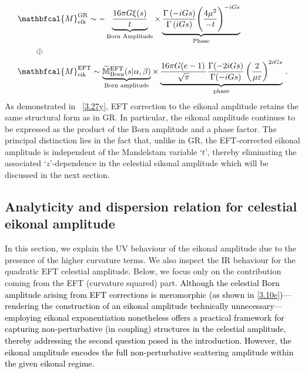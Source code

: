 \begin{tcolorbox}[thesisresultbox, title=Eikonal amplitude: GR vs EFT correction]
\restorethesisbodyformat
\begin{align}
    \begin{split}
&\mathbfcal{M}_{\textrm{eik}}^{\textrm{GR}}\sim -\underbrace{\frac{16  \pi  G \xi (s)}{t}}_{\text{Born Amplitude}}\times\underbrace{\frac{\Gamma\left(-iGs\right)}{\Gamma\left(iGs\right)}\Bigg(\frac{4\mu^2}{-t}\Bigg)^{-iGs}}_{\text{Phase}}\,\,\,\,\,\,\\ 
&
\hspace{0.8cm}\oplus
\\&
\mathbfcal{M}_{\textrm{eik}}^{\textrm{EFT}}\sim\underbrace{\widetilde{\mathbb{M}}^{\textrm{EFT}}_{\textrm{Born}}(s|\alpha,\beta)}_{\textrm{Born amplitude}}\times \underbrace{\frac{16\pi  G(e-1)\, } {\sqrt{\pi}}\frac{\Gamma(-2iGs)}{\Gamma(-iGs)}\left(\frac{2}{\mu\varepsilon}\right)^{2iGs}}_{\textrm{phase}}\,.\label{3.27y}
    \end{split}
\end{align}
As demonstrated in ~\eqref{3.27y}, EFT correction to the eikonal amplitude retains the same structural form as in GR. In particular, the eikonal amplitude continues to be expressed as the product of the Born amplitude and a phase factor. The principal distinction lies in the fact that, unlike in GR, the EFT-corrected eikonal amplitude is independent of the Mandelstam variable `\( t \)', thereby eliminating the associated `\( z \)'-dependence in the celestial eikonal amplitude which will be discussed in the next section.

\end{tcolorbox}
\restorethesisbodyformat
\subsection{Analyticity and dispersion relation for celestial eikonal amplitude}
In this section, we explain the  UV behaviour of the eikonal amplitude due to the presence of the higher curvature terms. We also inspect the IR behaviour for the quadratic EFT celestial amplitude. Below, we focus only on the contribution coming from the EFT (curvature squared) part. \textcolor{black}{Although the celestial Born amplitude arising from EFT corrections is meromorphic (as shown in \eqref{3.10e})—rendering the construction of an eikonal amplitude technically unnecessary—employing eikonal exponentiation nonetheless offers a practical framework for capturing non-perturbative (in coupling) structures in the celestial amplitude, thereby addressing the second question posed in the introduction. However, the eikonal amplitude encodes the full non-perturbative scattering amplitude within the given eikonal regime.  }


